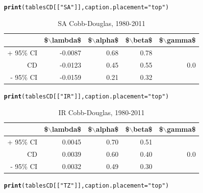 \documentclass[preprint,authoryear,12pt]{elsarticle}\usepackage{graphicx, color}
\makeatletter
\newcommand{\hlfunctioncall}[1]{\textcolor[rgb]{0.501960784313725,0,0.329411764705882}{\textbf{#1}}}%
\newcommand{\hlstring}[1]{\textcolor[rgb]{0.6,0.6,1}{#1}}%
\newenvironment{kframe}{%
 \def\at@end@of@kframe{}%
 \ifinner\ifhmode%
  \def\at@end@of@kframe{\end{minipage}}%
  \begin{minipage}{\columnwidth}%
 \fi\fi%
 \def\FrameCommand##1{\hskip\@totalleftmargin \hskip-\fboxsep
 \colorbox{shadecolor}{##1}\hskip-\fboxsep
     \hskip-\linewidth \hskip-\@totalleftmargin \hskip\columnwidth}%
 \MakeFramed {\advance\hsize-\width
   \@totalleftmargin\z@ \linewidth\hsize
   \@setminipage}}%
 {\par\unskip\endMakeFramed%
 \at@end@of@kframe}
\makeatother
\begin{document}
\begin{kframe}\begin{alltt}
\hlfunctioncall{print}(tablesCD[[\hlstring{"SA"}]], caption.placement=\hlstring{"top"})
\end{alltt}
\end{kframe}%
\begin{table}[ht]
\begin{center}
\caption{SA Cobb-Douglas, 1980-2011}
\begin{tabular}{rrrrr}
  \hline
 & \$$\backslash$lambda\$ & \$$\backslash$alpha\$ & \$$\backslash$beta\$ & \$$\backslash$gamma\$ \\ 
  \hline
+ 95\% CI & -0.0087 & 0.68 & 0.78 &  \\ 
  CD & -0.0123 & 0.45 & 0.55 & 0.0 \\ 
  - 95\% CI & -0.0159 & 0.21 & 0.32 &  \\ 
   \hline
\end{tabular}
\end{center}
\end{table}
\begin{kframe}\begin{alltt}
\hlfunctioncall{print}(tablesCD[[\hlstring{"IR"}]], caption.placement=\hlstring{"top"})
\end{alltt}
\end{kframe}%
\begin{table}[ht]
\begin{center}
\caption{IR Cobb-Douglas, 1980-2011}
\begin{tabular}{rrrrr}
  \hline
 & \$$\backslash$lambda\$ & \$$\backslash$alpha\$ & \$$\backslash$beta\$ & \$$\backslash$gamma\$ \\ 
  \hline
+ 95\% CI & 0.0045 & 0.70 & 0.51 &  \\ 
  CD & 0.0039 & 0.60 & 0.40 & 0.0 \\ 
  - 95\% CI & 0.0032 & 0.49 & 0.30 &  \\ 
   \hline
\end{tabular}
\end{center}
\end{table}
\begin{kframe}\begin{alltt}
\hlfunctioncall{print}(tablesCD[[\hlstring{"TZ"}]], caption.placement=\hlstring{"top"})
\end{alltt}
\end{kframe}%
\end{document}

